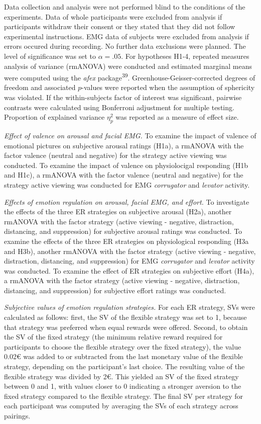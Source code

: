 \documentclass[
  man,floatsintext]{apa6}
\begin{document}
Data collection and analysis were not performed blind to the conditions of the experiments.
Data of whole participants were excluded from analysis if participants withdraw their consent or they stated that they did not follow experimental instructions.
EMG data of subjects were excluded from analysis if errors occured during recording.
No further data exclusions were planned.
The level of significance was set to \(\alpha=.05\).
For hypotheses H1-4, repeated measures analysis of variance (rmANOVA) were conducted and estimated marginal means were computed using the \emph{afex} package\textsuperscript{39}.
Greenhouse-Geisser-corrected degrees of freedom and associated \(p\)-values were reported when the assumption of sphericity was violated.
If the within-subjects factor of interest was significant, pairwise contrasts were calculated using Bonferroni adjustment for multiple testing.
Proportion of explained variance \(\eta_{p}^{2}\) was reported as a measure of effect size.

\emph{Effect of valence on arousal and facial EMG.}
To examine the impact of valence of emotional pictures on subjective arousal ratings (H1a), a rmANOVA with the factor valence (neutral and negative) for the strategy active viewing was conducted.
To examine the impact of valence on physiolocigal responding (H1b and H1c), a rmANOVA with the factor valence (neutral and negative) for the strategy active viewing was conducted for EMG \emph{corrugator} and \emph{levator} activity.

\emph{Effects of emotion regulation on arousal, facial EMG, and effort.}
To investigate the effects of the three ER strategies on subjective arousal (H2a), another rmANOVA with the factor strategy (active viewing - negative, distraction, distancing, and suppression) for subjective arousal ratings was conducted.
To examine the effects of the three ER strategies on physiological responding (H3a and H3b), another rmANOVA with the factor strategy (active viewing - negative, distraction, distancing, and suppression) for EMG \emph{corrugator} and \emph{levator} activity was conducted.
To examine the effect of ER strategies on subjective effort (H4a), a rmANOVA with the factor strategy (active viewing - negative, distraction, distancing, and suppression) for subjective effort ratings was conducted.

\emph{Subjective values of emotion regulation strategies.} For each ER strategy, SVs were calculated as follows: first, the SV of the flexible strategy was set to 1, because that strategy was preferred when equal rewards were offered.
Second, to obtain the SV of the fixed strategy (the minimum relative reward required for participants to choose the flexible strategy over the fixed strategy), the value 0.02€ was added to or subtracted from the last monetary value of the flexible strategy, depending on the participant's last choice.
The resulting value of the flexible strategy was divided by 2€.
This yielded an SV of the fixed strategy between 0 and 1, with values closer to 0 indicating a stronger aversion to the fixed strategy compared to the flexible strategy.
The final SV per strategy for each participant was computed by averaging the SVs of each strategy across pairings.
\end{document}
